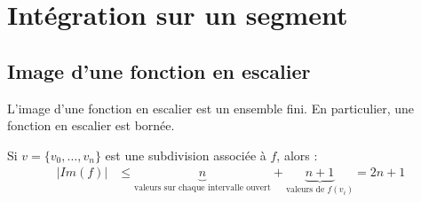 \documentclass[../main.tex]{subfiles}
\begin{document}
\setcounter{chapter}{25}
\chapter{Intégration sur un segment}
\tableofcontents
\clearpage

\section{Image d'une fonction en escalier}
\begin{tcolorbox}[title=Propostion 26.12, title filled=false, colframe=lightblue, colback=lightblue!10!white]
    L'image d'une fonction en escalier est un ensemble fini. En particulier, une fonction en escalier est bornée. 
\end{tcolorbox}

\noindent Si $v = \{ v_0, \ldots, v_n \}$ est une subdivision associée à $f$, alors : 
\begin{align*}
    |Im(f)| &\leq \underbrace{n}_{\text{valeurs sur chaque intervalle ouvert}} + \underbrace{n + 1}_{\text{valeurs de } f(v_i)} = 2n + 1
\end{align*}
\end{document}
